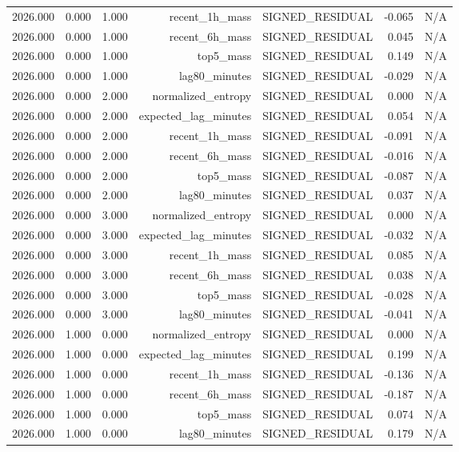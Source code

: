 \begin{table}[h!]
\begin{tabular}{lrrrrrr}
2026.000 & 0.000 & 1.000 & recent\_1h\_mass & SIGNED\_RESIDUAL & -0.065 & N/A \\
2026.000 & 0.000 & 1.000 & recent\_6h\_mass & SIGNED\_RESIDUAL & 0.045 & N/A \\
2026.000 & 0.000 & 1.000 & top5\_mass & SIGNED\_RESIDUAL & 0.149 & N/A \\
2026.000 & 0.000 & 1.000 & lag80\_minutes & SIGNED\_RESIDUAL & -0.029 & N/A \\
2026.000 & 0.000 & 2.000 & normalized\_entropy & SIGNED\_RESIDUAL & 0.000 & N/A \\
2026.000 & 0.000 & 2.000 & expected\_lag\_minutes & SIGNED\_RESIDUAL & 0.054 & N/A \\
2026.000 & 0.000 & 2.000 & recent\_1h\_mass & SIGNED\_RESIDUAL & -0.091 & N/A \\
2026.000 & 0.000 & 2.000 & recent\_6h\_mass & SIGNED\_RESIDUAL & -0.016 & N/A \\
2026.000 & 0.000 & 2.000 & top5\_mass & SIGNED\_RESIDUAL & -0.087 & N/A \\
2026.000 & 0.000 & 2.000 & lag80\_minutes & SIGNED\_RESIDUAL & 0.037 & N/A \\
2026.000 & 0.000 & 3.000 & normalized\_entropy & SIGNED\_RESIDUAL & 0.000 & N/A \\
2026.000 & 0.000 & 3.000 & expected\_lag\_minutes & SIGNED\_RESIDUAL & -0.032 & N/A \\
2026.000 & 0.000 & 3.000 & recent\_1h\_mass & SIGNED\_RESIDUAL & 0.085 & N/A \\
2026.000 & 0.000 & 3.000 & recent\_6h\_mass & SIGNED\_RESIDUAL & 0.038 & N/A \\
2026.000 & 0.000 & 3.000 & top5\_mass & SIGNED\_RESIDUAL & -0.028 & N/A \\
2026.000 & 0.000 & 3.000 & lag80\_minutes & SIGNED\_RESIDUAL & -0.041 & N/A \\
2026.000 & 1.000 & 0.000 & normalized\_entropy & SIGNED\_RESIDUAL & 0.000 & N/A \\
2026.000 & 1.000 & 0.000 & expected\_lag\_minutes & SIGNED\_RESIDUAL & 0.199 & N/A \\
2026.000 & 1.000 & 0.000 & recent\_1h\_mass & SIGNED\_RESIDUAL & -0.136 & N/A \\
2026.000 & 1.000 & 0.000 & recent\_6h\_mass & SIGNED\_RESIDUAL & -0.187 & N/A \\
2026.000 & 1.000 & 0.000 & top5\_mass & SIGNED\_RESIDUAL & 0.074 & N/A \\
2026.000 & 1.000 & 0.000 & lag80\_minutes & SIGNED\_RESIDUAL & 0.179 & N/A \\

\end{tabular}
\end{table}
